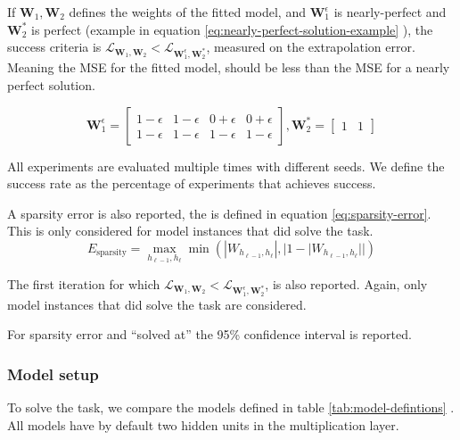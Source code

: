 If $\mathbf{W}_1, \mathbf{W}_2$ defines the weights of the fitted model, and $\mathbf{W}_1^\epsilon$ is nearly-perfect and $\mathbf{W}_2^*$ is perfect (example in equation \ref{eq:nearly-perfect-solution-example} ), the success criteria is $\mathcal{L}_{\mathbf{W}_1, \mathbf{W}_2} < \mathcal{L}_{\mathbf{W}_1^\epsilon, \mathbf{W}_2^*}$, measured on the extrapolation error. Meaning the MSE for the fitted model, should be less than the MSE for a nearly perfect solution.

\begin{equation}
    \mathbf{W}_1^\epsilon = \begin{bmatrix}
    1 - \epsilon & 1 - \epsilon & 0 + \epsilon & 0 + \epsilon \\
    1 - \epsilon & 1 - \epsilon & 1 - \epsilon & 1 - \epsilon
    \end{bmatrix}, \mathbf{W}_2^* = \begin{bmatrix}
    1 & 1
    \end{bmatrix}
    \label{eq:nearly-perfect-solution-example}
\end{equation}

All experiments are evaluated multiple times with different seeds. We define the success rate as the percentage of experiments that achieves success.

A sparsity error is also reported, the is defined in equation \ref{eq:sparsity-error}. This is only considered for model instances that did solve the task.
\begin{equation}
E_\mathrm{sparsity} = \max_{h_{\ell-1}, h_{\ell}} \min(|W_{h_{\ell-1},h_\ell}|, |1 - |W_{h_{\ell-1},h_\ell}||)
\label{eq:sparsity-error}
\end{equation}

The first iteration for which $\mathcal{L}_{\mathbf{W}_1, \mathbf{W}_2} < \mathcal{L}_{\mathbf{W}_1^\epsilon, \mathbf{W}_2^*}$, is also reported. Again, only model instances that did solve the task are considered.

For sparsity error and ``solved at'' the 95\% confidence interval is reported.

\subsubsection{Model setup}

To solve the task, we compare the models defined in table \ref{tab:model-defintions} . All models have by default two hidden units in the multiplication layer.

